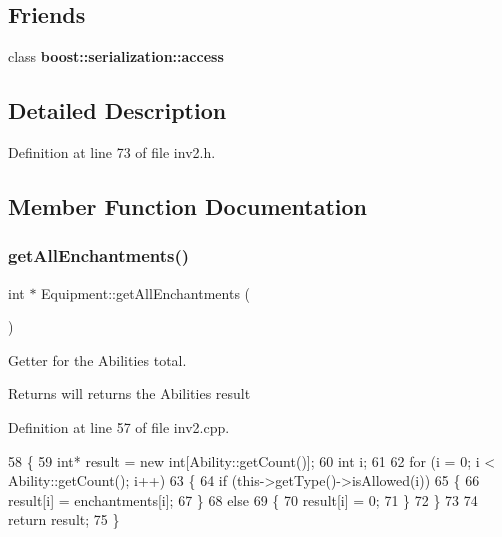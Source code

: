 \subsection*{Friends}
\begin{DoxyCompactItemize}
\item 
\hypertarget{class_equipment_ac98d07dd8f7b70e16ccb9a01abf56b9c}{}\label{class_equipment_ac98d07dd8f7b70e16ccb9a01abf56b9c} 
class {\bfseries boost\+::serialization\+::access}
\end{DoxyCompactItemize}


\subsection{Detailed Description}


Definition at line 73 of file inv2.\+h.



\subsection{Member Function Documentation}
\hypertarget{class_equipment_a9e2505f187dadc04a811a9d0680d29cf}{}\label{class_equipment_a9e2505f187dadc04a811a9d0680d29cf} 
\subsubsection{\texorpdfstring{get\+All\+Enchantments()}{getAllEnchantments()}}
{\footnotesize\ttfamily int $\ast$ Equipment\+::get\+All\+Enchantments (\begin{DoxyParamCaption}{ }\end{DoxyParamCaption})}



Getter for the Abilities total. 

\begin{DoxyReturn}{Returns}
will returns the Abilities result 
\end{DoxyReturn}


Definition at line 57 of file inv2.\+cpp.


\begin{DoxyCode}
58 \{
59     \textcolor{keywordtype}{int}* result = \textcolor{keyword}{new} \textcolor{keywordtype}{int}[Ability::getCount()];
60     \textcolor{keywordtype}{int} i;
61 
62     \textcolor{keywordflow}{for} (i = 0; i < Ability::getCount(); i++)
63     \{
64         \textcolor{keywordflow}{if} (this->getType()->isAllowed(i))
65         \{
66             result[i] = enchantments[i];
67         \}
68         \textcolor{keywordflow}{else}
69         \{
70             result[i] = 0;
71         \}
72     \}
73 
74     \textcolor{keywordflow}{return} result;
75 \}
\end{DoxyCode}
\hypertarget{class_equipment_ab56d6a16b2151d7793c4b5fddde1f145}{}\label{class_equipment_ab56d6a16b2151d7793c4b5fddde1f145} 
